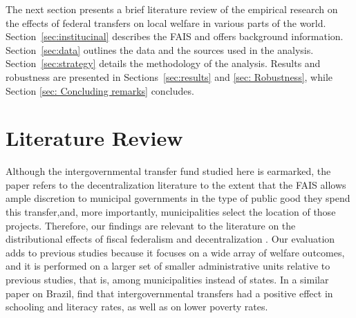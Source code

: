 \documentclass[dv_diss_main.tex]{subfiles}
\begin{document}
\iffalse
\begin{comment}
\textbf{Related literature1.---} This paper contributes to several strands of the literature. On the discussion about the type of resources and public service delivery. We show the limits of earmarked transfers. 
Need to build a section that compares our estimates .... Martinez-COL and Litschig-BRA , other in Africa and other in Asia

In a similar paper on Brazil, \cite{litschig2013impact} find that intergovernmental transfers had a positive effect in schooling and literacy rates, as well as on lower poverty rates.

*Come back to education outcomes and may be mortality rates

\textbf{Related literature2.---}
On the impact of transfer multipliers/ better poverty!!!!!. We find very little household per-capita income increasing, 

Look other studies besides Litschig-BRA, RAvi !!!!!
i not it is still open the idea  of looking at income 

\textbf{Related literature3.---}
On the literature that focus on decentralization and state capture of local public goods. We shows how private gains can be concentrated 
What can be said here???
\end{comment}
\fi
The next section presents a brief literature review of the empirical research on the effects of federal transfers on local welfare in various parts of the world. Section~\ref{sec:institucinal} describes the FAIS and offers background information. Section~\ref{sec:data} outlines the data and the sources used in the analysis. Section~\ref{sec:strategy} details the methodology of the analysis. Results and robustness are presented in Sections~\ref{sec:results} and \ref{sec: Robustness}, while Section \ref{sec: Concluding remarks} concludes.



\section{Literature Review} \label{sec:literarure}

Although the intergovernmental transfer fund studied here is earmarked, the paper refers to the decentralization literature to the extent that the FAIS allows ample discretion to municipal governments in the type of public good they spend this transfer,and, more importantly, municipalities select the location of those projects. Therefore, our findings are relevant to the literature on the distributional effects of fiscal federalism and decentralization \citep{oates1972fiscal,musgrave1983should,wallis1988decentralization,ostrom1993relational,litvack1998rethinking,habibi2003decentralization,jimenez2011impact,martinez2015impact}. Our evaluation adds to previous studies because it focuses on a wide array of welfare outcomes, and it is performed on a larger set of smaller administrative units relative to previous studies, that is, among municipalities instead of states. In a similar paper on Brazil, \cite{litschig2013impact} find that intergovernmental transfers had a positive effect in schooling and literacy rates, as well as on lower poverty rates.
\end{document}
